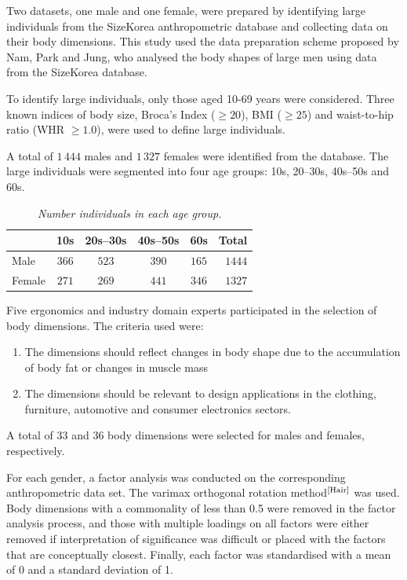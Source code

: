 \documentclass[12pt,a4paper,openany,UKenglish]{scrreprt}
\newcommand{\bib}[1]{$^\text{\cite{#1}}$}
\begin{document}
Two datasets, one male and one female, were prepared by identifying large individuals from the SizeKorea anthropometric database and collecting data on their body dimensions.
This study used the data preparation scheme proposed by Nam, Park and Jung, who analysed the body shapes of large men using data from the SizeKorea database.

To identify large individuals, only those aged 10-69 years were considered.
Three known indices of body size, Broca's Index ($\geqslant 20$), BMI ($\geqslant 25$) and waist-to-hip ratio (WHR $\geqslant 1.0$), were used to define large individuals.

A total of $1\,444$ males and $1\,327$ females were identified from the database.
The large individuals were segmented into four age groups: 10s, 20–30s, 40s–50s and 60s.
\begin{table}[H]
	\centering
	\caption{\centering\itshape Number individuals in each age group.}
	\begin{tabular}{lccccr}
		\hline\hline
		       & 10s   & 20s–30s & 40s–50s & 60s   & Total  \\
		\hline
		Male   & $366$ & $523$   & $390$   & $165$ & $1444$ \\
		Female & $271$ & $269$   & $441$   & $346$ & $1327$ \\
		\hline\hline
	\end{tabular}
\end{table}

Five ergonomics and industry domain experts participated in the selection of body dimensions. The criteria used were:
\begin{enumerate}[nolistsep]
	\item The dimensions should reflect changes in body shape due to the accumulation of body fat or changes in muscle mass
	\item The dimensions should be relevant to design applications in the clothing, furniture, automotive and consumer electronics sectors.
\end{enumerate}
A total of 33 and 36 body dimensions were selected for males and females, respectively.

For each gender, a factor analysis was conducted on the corresponding anthropometric data set.
The varimax orthogonal rotation method\bib{Hair} was used.
Body dimensions with a commonality of less than 0.5 were removed in the factor analysis process, and those with multiple loadings on all factors were either removed if interpretation of significance was difficult or placed with the factors that are conceptually closest.
Finally, each factor was standardised with a mean of 0 and a standard deviation of 1.
\end{document}
